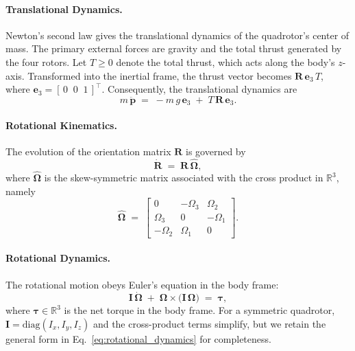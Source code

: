 \documentclass[12pt,twoside,letterpaper]{article}
\begin{document}
\paragraph{Translational Dynamics.} 
Newton’s second law gives the translational dynamics of the quadrotor’s center of mass. The primary external forces are gravity and the total thrust generated by the four rotors. Let $T \ge 0$ denote the total thrust, which acts along the body’s $z$-axis. Transformed into the inertial frame, the thrust vector becomes $\mathbf{R}\,\mathbf{e}_3\,T$, where $\mathbf{e}_3 = [\,0\;\;0\;\;1\,]^\top$. Consequently, the translational dynamics are
\begin{equation}
    m\,\ddot{\mathbf{p}} \;=\; -m\,g\,\mathbf{e}_3 \;+\; T\,\mathbf{R}\,\mathbf{e}_3.
    \label{eq:translational_dynamics}
\end{equation}

\paragraph{Rotational Kinematics.} 
The evolution of the orientation matrix $\mathbf{R}$ is governed by
\begin{equation}
    \dot{\mathbf{R}} \;=\; \mathbf{R}\,\widehat{\boldsymbol{\Omega}},
    \label{eq:rotational_kinematics}
\end{equation}
where $\widehat{\boldsymbol{\Omega}}$ is the skew-symmetric matrix associated with the cross product in $\mathbb{R}^3$, namely
\begin{equation}
    \widehat{\boldsymbol{\Omega}} 
    \;=\;
    \begin{bmatrix}
    0 & -\Omega_3 & \Omega_2 \\
    \Omega_3 & 0 & -\Omega_1 \\
    -\Omega_2 & \Omega_1 & 0
    \end{bmatrix}.
\end{equation}

\paragraph{Rotational Dynamics.} 
The rotational motion obeys Euler’s equation in the body frame:
\begin{equation}
    \mathbf{I}\,\dot{\boldsymbol{\Omega}} 
    \;+\;
    \boldsymbol{\Omega} \times \bigl(\mathbf{I}\,\boldsymbol{\Omega}\bigr)
    \;=\;
    \boldsymbol{\tau},
    \label{eq:rotational_dynamics}
\end{equation}
where $\boldsymbol{\tau} \in \mathbb{R}^3$ is the net torque in the body frame. For a symmetric quadrotor, $\mathbf{I} = \mathrm{diag}(I_x, I_y, I_z)$ and the cross-product terms simplify, but we retain the general form in Eq.~\eqref{eq:rotational_dynamics} for completeness.
\end{document}
